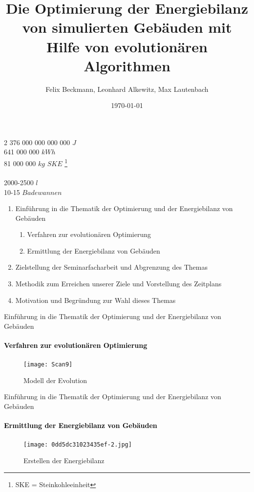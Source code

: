 \documentclass[11pt]{beamer}
\author{Felix Beckmann, Leonhard Alkewitz, Max Lautenbach}
\title{Die Optimierung der Energiebilanz von simulierten Gebäuden mit Hilfe von evolutionären Algorithmen}
\institute{Spezialschulteil des Albert-Schweizer Gymnasium Erfurt}
\date{\today}
\begin{document}
\begin{frame}
\begin{center}
\pause \huge{2 376 000 000 000 000 $J$}  \\  
\pause \huge{641 000 000 $kWh$} \\ 
\pause \huge{81 000 000 $kg$ $SKE$ \footnote{SKE = Steinkohleeinheit}} \\ 
\hrulefill{}  \\
\pause \huge{2000-2500 $l$} \\ 
\pause \huge{10-15 $Badewannen$}
\end{center}
\end{frame}

\begin{frame}
\titlepage
\end{frame}

\begin{frame}
\begin{enumerate}
\item{Einführung in die Thematik der Optimierung und der Energiebilanz von Gebäuden}
\begin{enumerate}
\item{Verfahren zur evolutionären Optimierung}
\item{Ermittlung der Energiebilanz von Gebäuden}
\end{enumerate}
\item{Zielstellung der Seminarfacharbeit und Abgrenzung des Themas}
\item{Methodik zum Erreichen unserer Ziele und Vorstellung des Zeitplans}
\item{Motivation und Begründung zur Wahl dieses Themas}
\end{enumerate}
\end{frame}

\begin{frame}{Einführung in die Thematik der Optimierung und der Energiebilanz von Gebäuden}
\framesubtitle{\large{\textcolor{black}{Verfahren zur evolutionären Optimierung}}}
\begin{figure}
\texttt{[image: Scan9]}
\caption{Modell der Evolution}
\end{figure}
\end{frame}

\begin{frame}{Einführung in die Thematik der Optimierung und der Energiebilanz von Gebäuden}
\framesubtitle{\large{\textcolor{black}{Ermittlung der Energiebilanz von Gebäuden}}}
\begin{figure}
\texttt{[image: 0dd5dc31023435ef-2.jpg]} 
\caption{Erstellen der Energiebilanz}
\end{figure}
\end{frame}
\end{document}
